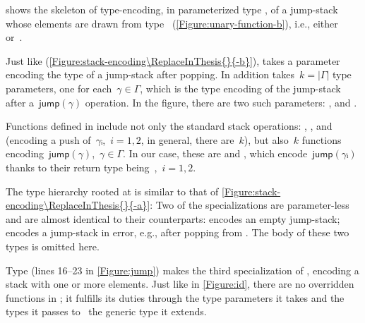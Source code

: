 \documentclass[a4paper,USenglish]{lipics-v2016}
\begin{document}
 shows the skeleton of type-encoding, in parameterized type ,
  of a jump-stack whose elements are drawn from type~
(\cref{Figure:unary-function-b}), i.e., either~ or~.

Just like  (\cref{Figure:stack-encoding\ReplaceInThesis{}{-b}}),  takes
  a  parameter encoding the type of a jump-stack after popping.
In addition  takes~$k=|Γ|$ type parameters, one for each~$γ∈Γ$,
  which is the type encoding of the jump-stack after a~$\textsf{jump}(γ)$
  operation.
In the figure, there are two such parameters: , and
  .

Functions defined in  include not only the standard stack operations: ,
,  and~ (encoding a push of~$γᵢ$,~$i=1,2$, in general, there are~$k$),
but also~$k$ functions encoding~$\textsf{jump}(γ)$,~$γ∈Γ$.
In our case, these are  and ,
  which encode~$\textsf{jump}(γᵢ)$
  thanks to their return type being~,~$i=1,2$.

The type hierarchy rooted at  is similar to that of
\cref{Figure:stack-encoding\ReplaceInThesis{}{-a}}:
Two of the specializations are parameter-less and are
  almost identical to their 
  counterparts:
 encodes an empty jump-stack;  encodes a jump-stack in error,
e.g., after popping from .
The body of these two types is omitted here.

Type  (lines 16--23 in \cref{Figure:jump}) makes the third specialization of , encoding
  a stack with one or more elements.
Just like in \cref{Figure:id}, there are no overridden functions in ; it fulfills
  its duties through the type parameters it takes and the types it passes
  to~ the generic type it extends.
\end{document}
